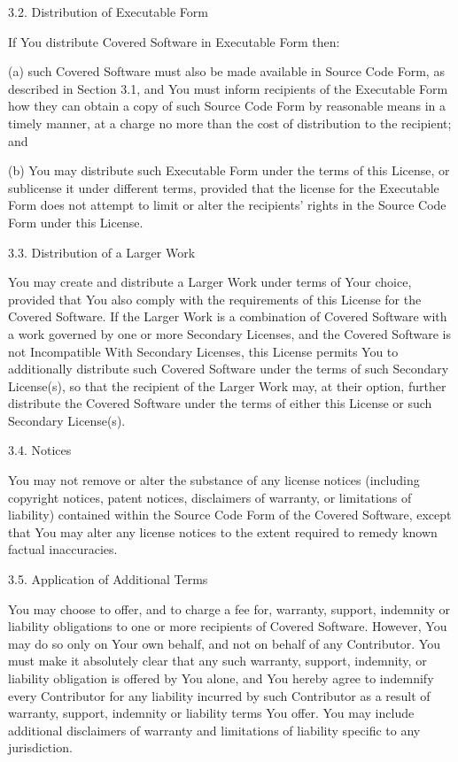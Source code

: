 \begin{DoxyVerb}
3.2. Distribution of Executable Form

If You distribute Covered Software in Executable Form then:

(a) such Covered Software must also be made available in Source Code
 Form, as described in Section 3.1, and You must inform recipients of
 the Executable Form how they can obtain a copy of such Source Code
 Form by reasonable means in a timely manner, at a charge no more
 than the cost of distribution to the recipient; and

(b) You may distribute such Executable Form under the terms of this
 License, or sublicense it under different terms, provided that the
 license for the Executable Form does not attempt to limit or alter
 the recipients' rights in the Source Code Form under this License.

3.3. Distribution of a Larger Work

You may create and distribute a Larger Work under terms of Your choice,
provided that You also comply with the requirements of this License for
the Covered Software. If the Larger Work is a combination of Covered
Software with a work governed by one or more Secondary Licenses, and the
Covered Software is not Incompatible With Secondary Licenses, this
License permits You to additionally distribute such Covered Software
under the terms of such Secondary License(s), so that the recipient of
the Larger Work may, at their option, further distribute the Covered
Software under the terms of either this License or such Secondary
License(s).

3.4. Notices

You may not remove or alter the substance of any license notices
(including copyright notices, patent notices, disclaimers of warranty,
or limitations of liability) contained within the Source Code Form of
the Covered Software, except that You may alter any license notices to
the extent required to remedy known factual inaccuracies.

3.5. Application of Additional Terms

You may choose to offer, and to charge a fee for, warranty, support,
indemnity or liability obligations to one or more recipients of Covered
Software. However, You may do so only on Your own behalf, and not on
behalf of any Contributor. You must make it absolutely clear that any
such warranty, support, indemnity, or liability obligation is offered by
You alone, and You hereby agree to indemnify every Contributor for any
liability incurred by such Contributor as a result of warranty, support,
indemnity or liability terms You offer. You may include additional
disclaimers of warranty and limitations of liability specific to any
jurisdiction.


\end{DoxyVerb}
